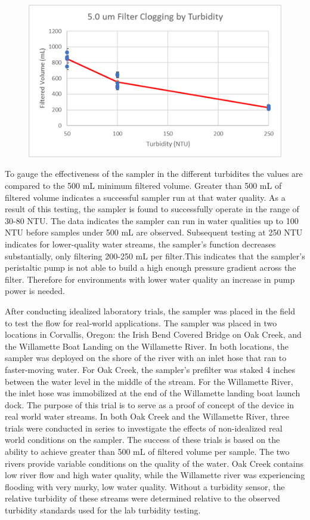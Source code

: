 \documentclass[11pt, letterpaper]{article}
\begin{document}
\begin{figure}[H]
	\centering
	\includegraphics[scale=1]{./Assets/Turbidity.png}
	\caption{}
\end{figure}
\par\noindent
To gauge the effectiveness of the sampler in the different turbidites the values are compared to the 500 mL minimum filtered volume. Greater than 500 mL of filtered volume indicates a successful sampler run at that water quality. As a result of this testing, the sampler is found to successfully operate in the range of 30-80 NTU. The data indicates the sampler can run in water qualities up to 100 NTU before samples under 500 mL are observed. Subsequent testing at 250 NTU indicates for lower-quality water streams, the sampler’s function decreases substantially, only filtering 200-250 mL per filter.This indicates that the sampler’s peristaltic pump is not able to build a high enough pressure gradient across the filter. Therefore for environments with lower water quality an increase in pump power is needed.
\newline\par\noindent
After conducting idealized laboratory trials, the sampler was placed in the field to test the flow for real-world applications. The sampler was placed in two locations in Corvallis, Oregon: the Irish Bend Covered Bridge on Oak Creek, and the Willamette Boat Landing on the Willamette River. In both locations, the sampler was deployed on the shore of the river with an inlet hose that ran to faster-moving water. For Oak Creek, the sampler’s prefilter was staked 4 inches between the water level in the middle of the stream. For the Willamette River, the inlet hose was immobilized at the end of the Willamette landing boat launch dock. The purpose of this trial is to serve as a proof of concept of the device in real world water streams. In both Oak Creek and the Willamette River, three trials were conducted in series to investigate the effects of non-idealized real world conditions on the sampler. The success of these trials is based on the ability to achieve greater than 500 mL of filtered volume per sample. The two rivers provide variable conditions on the quality of the water. Oak Creek contains low river flow and high water quality, while the Willamette river was experiencing flooding with very murky, low water quality. Without a turbidity sensor, the relative turbidity of these streams were determined relative to the observed turbidity standards used for the lab turbidity testing.
\end{document}
